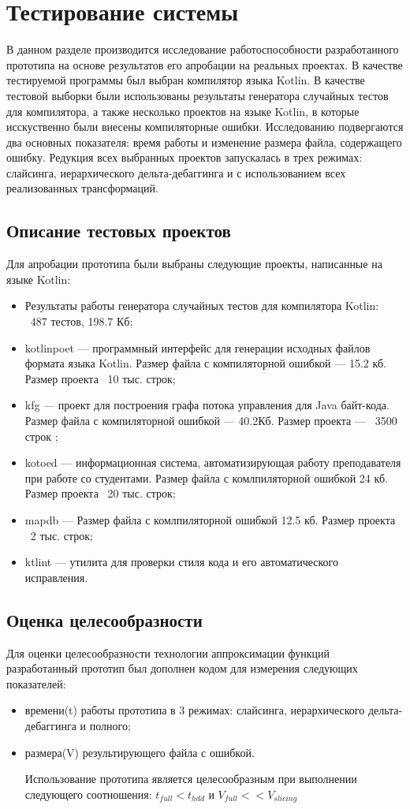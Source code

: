 \chapter{Тестирование системы}

В данном разделе производится исследование работоспособности разработанного прототипа на основе результатов его апробации на реальных проектах. В качестве тестируемой программы был выбран компилятор языка Kotlin. В качестве тестовой выборки были использованы результаты генератора случайных тестов для компилятора, а также несколько проектов на языке Kotlin, в которые исскуственно были внесены компиляторные ошибки. Исследованию подвергаются два основных показателя: время работы и изменение размера файла, содержащего ошибку. Редукция всех выбранных проектов запускалась в трех режимах: слайсинга, иерархического дельта-дебаггинга и с использованием всех реализованных трансформаций.
\section{Описание тестовых проектов}
Для апробации прототипа были выбраны следующие проекты, написанные на языке Kotlin:
\begin{itemize}
\item Результаты работы генератора случайных тестов для компилятора Kotlin: ~487 тестов, 198.7 Кб;
\item kotlinpoet --- программный интерфейс для генерации исходных файлов формата языка Kotlin. Размер файла с компиляторной ошибкой --- 15.2 кб. Размер проекта ~10 тыс. строк;
\item kfg --- проект для построения графа потока управления для Java байт-кода. Размер файла с компиляторной ошибкой --- 40.2Кб. Размер проекта --- ~3500 строк  ;
\item kotoed --- информационная система, автоматизирующая работу преподавателя при работе со студентами. Размер файла с комлпиляторной ошибкой 24 кб. Размер проекта ~20 тыс. строк;
\item mapdb --- Размер файла с комлпиляторной ошибкой 12.5 кб. Размер проекта ~2 тыс. строк;
\item ktlint --- утилита для проверки стиля кода и его автоматического исправления.
\end{itemize}


\section{Оценка целесообразности}
Для оценки целесообразности технологии аппроксимации функ­ций разработанный прототип был дополнен кодом для измерения следующих показателей:
\begin{itemize}
	\item времени(t) работы прототипа в 3 режимах: слайсинга, иерархического дельта-дебаггинга и полного;
	\item размера(V) результирующего файла с ошибкой.
	
Использование прототипа является целесообразным при выполнении следующего соотношения: $t_{full} < t_{hdd}$ и $V_{full} << V_{slicing}$
\end{itemize}


